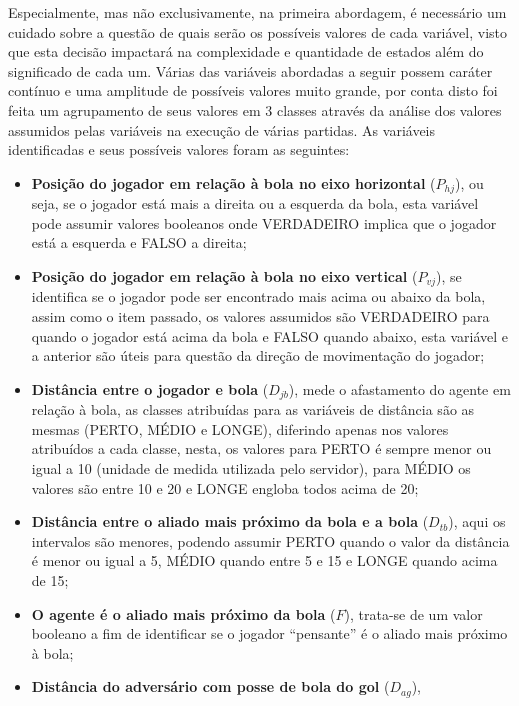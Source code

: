 Especialmente, mas não exclusivamente, na primeira abordagem, é necessário um
cuidado sobre a questão de quais serão os possíveis valores de cada variável,
visto que esta decisão impactará na complexidade e quantidade de estados além
do significado de cada um. Várias das variáveis abordadas a seguir possem
caráter contínuo e uma amplitude de possíveis valores muito grande, por conta
disto foi feita um agrupamento de seus valores em 3 classes através da análise
dos valores assumidos pelas variáveis na execução de várias partidas. As
variáveis identificadas e seus possíveis valores foram as seguintes:

\begin{itemize}
    \item \textbf{Posição do jogador em relação à bola no eixo horizontal}
    ($P_{hj}$), ou seja, se o jogador está mais a direita ou a esquerda da
    bola, esta variável pode assumir valores booleanos onde VERDADEIRO implica
    que o jogador está a esquerda e FALSO a direita;
    \item \textbf{Posição do jogador em relação à bola no eixo vertical}
    ($P_{vj}$), se identifica se o jogador pode ser encontrado mais acima ou
    abaixo da bola, assim como o item passado, os valores assumidos são
    VERDADEIRO para quando o jogador está acima da bola e FALSO quando abaixo,
    esta variável e a anterior são úteis para questão da direção de movimentação
    do jogador;
    \item \textbf{Distância entre o jogador e bola} ($D_{jb}$), mede o
    afastamento do agente em relação à bola, as classes atribuídas para as
    variáveis de distância são as mesmas (PERTO, MÉDIO e LONGE), diferindo
    apenas nos valores atribuídos a cada classe, nesta, os valores para PERTO é
    sempre menor ou igual a 10 (unidade de medida utilizada pelo servidor), para
    MÉDIO os valores são entre 10 e 20 e LONGE engloba todos acima de 20;
    \item \textbf{Distância entre o aliado mais próximo da bola e a bola}
    ($D_{tb}$), aqui os intervalos são menores, podendo assumir PERTO quando o
    valor da distância é menor ou igual a 5, MÉDIO quando entre 5 e 15 e LONGE
    quando acima de 15;
    \item \textbf{O agente é o aliado mais próximo da bola} ($F$), trata-se de
    um valor booleano a fim de identificar se o jogador ``pensante'' é o aliado
    mais próximo à bola;
    \item \textbf{Distância do adversário com posse de bola do gol} ($D_{ag}$),

\end{itemize}
